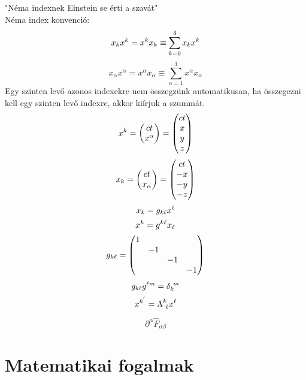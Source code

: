 \documentclass[a4paper,12pt]{article}
\begin{document}
"Néma indexnek Einstein se érti a szavát"\\
Néma index konvenció:\\
\[ x_kx^k = x^kx_k \equiv \sum\limits_{k=0}^3 x_k x^k \]
\[ x_\alpha x^\alpha = x^\alpha x_\alpha \equiv \sum\limits_{\alpha=1}^3 x^\alpha x_\alpha \]
Egy szinten levő azonos indexekre nem összegzünk automatikusan, ha összegezni kell egy szinten levő indexre, akkor kiírjuk a
szummát.
\[ x^k = \begin{pmatrix} ct \\ x^\alpha \end{pmatrix} = \begin{pmatrix} ct \\ x \\ y \\ z \end{pmatrix} \]
\[ x_k = \begin{pmatrix} ct \\ x_\alpha \end{pmatrix} = \begin{pmatrix} ct \\ -x \\ -y \\ -z \end{pmatrix} \]
\[ x_k = g_{k\ell} x^{\ell} \]
\[ x^k = g^{k\ell}x_{\ell} \]
\[ g_{k\ell} = \begin{pmatrix} 1 & ~ & ~ & ~ \\ ~ & -1 & ~ & ~ \\ ~ & ~ & -1 & ~ \\ ~ & ~ & ~ & -1 \end{pmatrix} \]
\[ g_{k\ell} g^{\ell m} = \delta_k^{~m} \]
\[ x^{k^{'}} = \Lambda^k_{~\ell} x^{\ell} \]

\[\partial^\alpha \hat{F}_{\alpha\beta}\]
\appendix
\section{Matematikai fogalmak}
\end{document}
